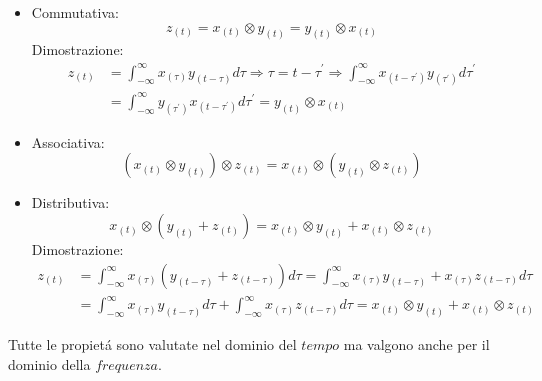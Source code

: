             \begin{itemize}
                \item {
                        Commutativa:
                        \[
                            z_{(t)} = x_{(t)} \otimes  y_{(t)} = y_{(t)} \otimes  x_{(t)}  
                        \]
                        Dimostrazione:
                        \begin{align}
                            z_{(t)} &= \int_{-\infty}^{\infty} x_{(\tau)}y_{(t-\tau)} d\tau \Rightarrow \tau=t-\tau^\prime\Rightarrow \int_{-\infty}^{\infty} x_{(t-\tau^\prime)}y_{(\tau^\prime)} d\tau^\prime \nonumber \\
                                    &= \int_{-\infty}^{\infty} y_{(\tau^\prime)}x_{(t-\tau^\prime)} d\tau^\prime = y_{(t)} \otimes  x_{(t)}\nonumber 
                        \end{align}
                    }\label{Conv. Commutativa}
                \item {
                        Associativa:
                        \[
                            (x_{(t)} \otimes  y_{(t)}) \otimes z_{(t)}  =x_{(t)} \otimes  (y_{(t)} \otimes z_{(t)})   
                        \]
                    }\label{Conv. Distributiva}
                \item {
                        Distributiva:
                        \[
                            x_{(t)} \otimes  (y_{(t)}+z_{(t)}) = x_{(t)}\otimes  y_{(t)} +x_{(t)}\otimes  z_{(t)}  
                        \]
                        Dimostrazione:
                        \begin{align}
                            z_{(t)} &= \int_{-\infty}^{\infty} x_{(\tau)}(y_{(t-\tau)}+z_{(t-\tau)}) d\tau = \int_{-\infty}^{\infty}x_{(\tau)}y_{(t-\tau)} +x_{(\tau)}z_{(t-\tau)} d\tau \nonumber \\
                                    &= \int_{-\infty}^{\infty}x_{(\tau)}y_{(t-\tau)} d\tau +\int_{-\infty}^{\infty}x_{(\tau)}z_{(t-\tau)} d\tau = x_{(t)}\otimes  y_{(t)} +x_{(t)}\otimes  z_{(t)} \nonumber 
                        \end{align}
                    }\label{Conv. Associativa}
            \end{itemize}
            Tutte le propietá sono valutate nel dominio del $tempo$ ma valgono anche per il dominio della $frequenza$.
